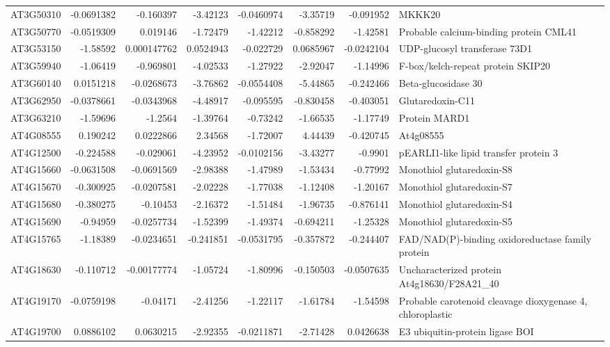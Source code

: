 \documentclass[11pt]{article}
\begin{document}
\begin{center}
\begin{tabular}{lrrrrrrl}
AT3G50310 & -0.0691382 & -0.160397 & -3.42123 & -0.0460974 & -3.35719 & -0.091952 & MKKK20\\
AT3G50770 & -0.0519309 & 0.019146 & -1.72479 & -1.42212 & -0.858292 & -1.42581 & Probable calcium-binding protein CML41\\
AT3G53150 & -1.58592 & 0.000147762 & 0.0524943 & -0.022729 & 0.0685967 & -0.0242104 & UDP-glucosyl transferase 73D1\\
AT3G59940 & -1.06419 & -0.969801 & -4.02533 & -1.27922 & -2.92047 & -1.14996 & F-box/kelch-repeat protein SKIP20\\
AT3G60140 & 0.0151218 & -0.0268673 & -3.76862 & -0.0554408 & -5.44865 & -0.242466 & Beta-glucosidase 30\\
AT3G62950 & -0.0378661 & -0.0343968 & -4.48917 & -0.095595 & -0.830458 & -0.403051 & Glutaredoxin-C11\\
AT3G63210 & -1.59696 & -1.2564 & -1.39764 & -0.73242 & -1.66535 & -1.17749 & Protein MARD1\\
AT4G08555 & 0.190242 & 0.0222866 & 2.34568 & -1.72007 & 4.44439 & -0.420745 & At4g08555\\
AT4G12500 & -0.224588 & -0.029061 & -4.23952 & -0.0102156 & -3.43277 & -0.9901 & pEARLI1-like lipid transfer protein 3\\
AT4G15660 & -0.0631508 & -0.0691569 & -2.98388 & -1.47989 & -1.53434 & -0.77992 & Monothiol glutaredoxin-S8\\
AT4G15670 & -0.300925 & -0.0207581 & -2.02228 & -1.77038 & -1.12408 & -1.20167 & Monothiol glutaredoxin-S7\\
AT4G15680 & -0.380275 & -0.10453 & -2.16372 & -1.51484 & -1.96735 & -0.876141 & Monothiol glutaredoxin-S4\\
AT4G15690 & -0.94959 & -0.0257734 & -1.52399 & -1.49374 & -0.694211 & -1.25328 & Monothiol glutaredoxin-S5\\
AT4G15765 & -1.18389 & -0.0234651 & -0.241851 & -0.0531795 & -0.357872 & -0.244407 & FAD/NAD(P)-binding oxidoreductase family protein\\
AT4G18630 & -0.110712 & -0.00177774 & -1.05724 & -1.80996 & -0.150503 & -0.0507635 & Uncharacterized protein At4g18630/F28A21\_40\\
AT4G19170 & -0.0759198 & -0.04171 & -2.41256 & -1.22117 & -1.61784 & -1.54598 & Probable carotenoid cleavage dioxygenase 4, chloroplastic\\
AT4G19700 & 0.0886102 & 0.0630215 & -2.92355 & -0.0211871 & -2.71428 & 0.0426638 & E3 ubiquitin-protein ligase BOI\\

\end{tabular}
\end{center}
\end{document}
